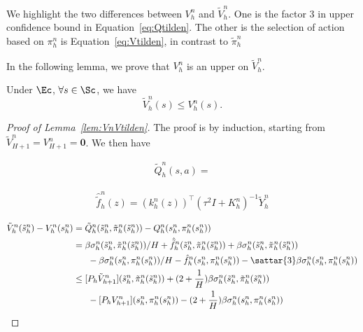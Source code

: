 We highlight the two differences between ${V}^n_h$ and $\tilde{V}^n_h$. One is the factor $3$ in upper confidence bound in Equation~\eqref{eq:Qtilden}. The other is the selection of action based on $\pi^n_h$ is Equation~\eqref{eq:Vtilden}, in contrast to $\tilde{\pi}^n_h$

In the following lemma, we prove that ${V}^n_h$ is an upper on $\tilde{V}^n_h$.

\begin{lemma}\label{lem:VnVtilden}
Under $\Ec$, $\forall s\in\Sc$, we have
\begin{equation*}
    \tilde{V}^n_h(s)\le {V}^n_h(s).
\end{equation*}
\end{lemma}
\begin{proof}[Proof of Lemma~\ref{lem:VnVtilden}]
The proof is by induction, starting from $\tilde{V}^n_{H+1} = {V}^n_{H+1}=\bm{0}$. We then have


\begin{align*}
    \tilde{Q}^n_h(s,a) = 
\end{align*}


\begin{align*}
    \hat{\tilde{f}}_h^n(z) = (k^n_h(z))^{\top}(\tau^2I+K^n_h)^{-1}\tilde{Y}^{n}_h
\end{align*}










\begin{align*}
    \tilde{V}^n_h(\tilde{s}^n_h) - {V}^n_h({s}^n_h) &= \tilde{Q}^n_h(\tilde{s}^n_h,\tilde{\pi}^n_h(\tilde{s}^n_h)) - {Q}^n_h(s^n_h, \pi^n_h(s^n_h))\\
    &=\beta\sigma^n_h(\tilde{s}^n_h,\tilde{\pi}^n_h(\tilde{s}^n_h))/H +  \hat{\tilde{f}}_h^n(\tilde{s}^n_h,\tilde{\pi}^n_h(\tilde{s}^n_h)) + \beta\sigma_h^n(\tilde{s}^n_h,\tilde{\pi}^n_h(\tilde{s}^n_h)) \\
    & ~~~~~ - \beta\sigma^n_h(s^n_h,\pi^n_h(s^n_h))/H -  \hat{{f}}_h^n(s^n_h,\pi^n_h(s^n_h)) - \sattar{3}\beta\sigma_h^n(s^n_h,\pi^n_h(s^n_h))\\
    &\le  [P_h\tilde{V}^{n}_{h+1}](\tilde{s}^n_h,\tilde{\pi}^n_h(\tilde{s}^n_h)) + (2+\frac{1}{H})\beta\sigma^n_h(\tilde{s}^n_h,\tilde{\pi}^n_h(\tilde{s}^n_h)) \\
    & ~~~~~ - [P_h{V}^{n}_{h+1}](s^n_h,\pi^n_h(s^n_h)) - (2+\frac{1}{H})\beta\sigma^n_h(s^n_h,\pi^n_h(s^n_h)) 
\end{align*}




\end{proof}
